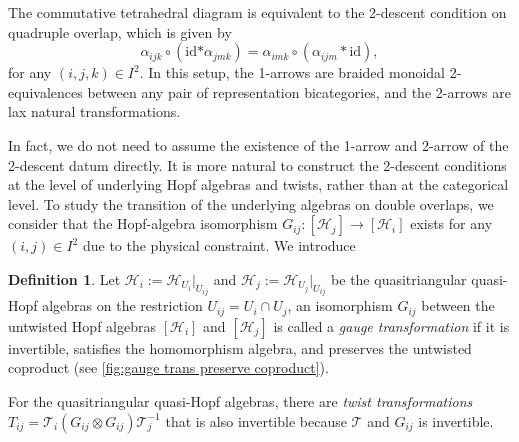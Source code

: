 \documentclass[reqno]{amsart}
\theoremstyle{definition}
\newtheorem{definition}[formula]{Definition}
\theoremstyle{remark}
\begin{document}
The commutative tetrahedral diagram is equivalent to the 2-descent condition on quadruple overlap, which is given by
\begin{equation}
    {\alpha _{ijk}} \circ \left( {{\text{id*}}{\alpha _{jmk}}} \right) = {\alpha _{imk}} \circ \left( {{\alpha _{ijm}}*{\text{id}}} \right),
\end{equation}
for any $(i,j,k) \in I^2$. In this setup, the 1-arrows are braided monoidal 2-equivalences between any pair of representation bicategories, and the 2-arrows are lax natural transformations. 

In fact, we do not need to assume the existence of the 1-arrow and 2-arrow of the 2-descent datum directly. It is more natural to construct the 2-descent conditions at the level of underlying Hopf algebras and twists, rather than at the categorical level. To study the transition of the underlying algebras on double overlaps, we consider that the Hopf-algebra isomorphism $G_{ij}:\left[\mathscr{H}_j\right]\longrightarrow\left[\mathscr{H}_i\right]$ exists for any $(i,j)\in I^2$ due to the physical constraint. We introduce 
\begin{definition}
    Let $\mathscr{H}_i := \mathscr{H}_{U_i}|_{U_{ij}}$ and $\mathscr{H}_j := \mathscr{H}_{U_j}|_{U_{ij}}$ be the quasitriangular quasi-Hopf algebras on the restriction $U_{ij}=U_i\cap U_j$, an isomorphism $G_{ij}$ between the untwisted Hopf algebras $\left[\mathscr{H}_i\right]$ and $\left[\mathscr{H}_j\right]$ is called a \textit{gauge transformation} if it is invertible, satisfies the homomorphism algebra, and preserves the untwisted coproduct (see \cref{fig:gauge trans preserve coproduct}).
\end{definition}
For the quasitriangular quasi-Hopf algebras, there are \textit{twist transformations} $T_{ij}=\mathcal{T}_i \left(G_{ij}\otimes G_{ij}\right)\mathcal{T}_j^{-1}$ that is also invertible because $\mathcal{T}$ and $G_{ij}$ is invertible.
\end{document}
